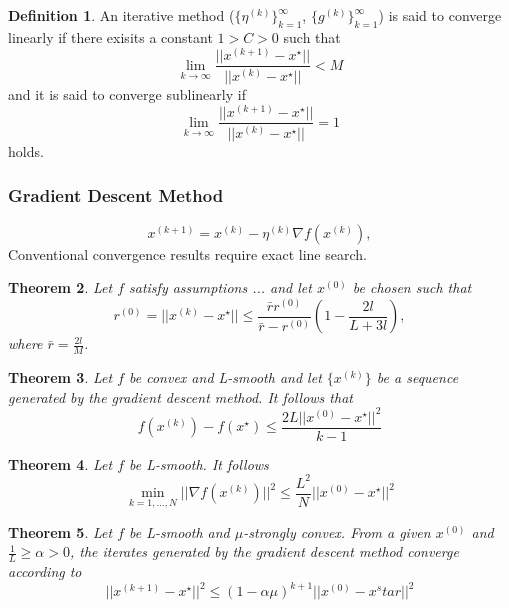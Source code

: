 \documentclass[12pt]{article}
\newtheorem{theorem}{Theorem}[section]
\theoremstyle{definition}
\newtheorem{definition}[theorem]{Definition}
\numberwithin{equation}{section}
\begin{document}
\begin{definition}
  An iterative method ($\{\eta^{(k)}\}_{k=1}^\infty$, $\{g^{(k)}\}_{k=1}^\infty$) is said to converge linearly if there exisits a constant $1 > C > 0$ such that 
  \begin{equation}
    \lim_{k \rightarrow \infty} \frac{||x^{(k+1)} - x^\star||}{||x^{(k)} - x^\star||} < M
  \end{equation}
  and it is said to converge sublinearly if 
  \begin{equation}
    \lim_{k \rightarrow \infty} \frac{||x^{(k+1)} - x^\star||}{||x^{(k)} - x^\star||} = 1
  \end{equation}
  holds.
\end{definition}
\subsubsection{Gradient Descent Method}
\begin{equation}  
  x^{(k+1)} = x^{(k)} - \eta^{(k)} \nabla f(x^{(k)}),
\end{equation}
Conventional convergence results require exact line search.

\cite{nesterov2003introductory}
\begin{theorem}
  Let $f$ satisfy assumptions ... and let $x^{(0)}$ be chosen such that 
  \begin{equation}
    r^{(0)} = ||x^{(k)} - x^\star|| \leq \frac{\bar{r}r^{(0)}}{\bar{r}-r^{(0)}}(1-\frac{2l}{L+3l}),
  \end{equation}
  where $\bar{r} = \frac{2l}{M}$.
\end{theorem}

\begin{theorem}
  Let $f$ be convex and L-smooth and let $\{x^{(k)}\}$ be a sequence generated by the gradient descent method. It follows that 
  \begin{equation}
    f(x^{(k)}) - f(x^\star) \leq \frac{2L||x^{(0)} - x^\star||^2}{k-1}
  \end{equation}
\end{theorem}

\begin{theorem}
  Let $f$ be L-smooth. It follows
  \begin{equation}
    \min_{k=1,\dots,N} ||\nabla f(x^{(k)})||^2 \leq \frac{L^2}{N}||x^{(0)}-x^\star||^2
  \end{equation}
\end{theorem}

\begin{theorem}
  Let $f$ be L-smooth and $\mu$-strongly convex. From a given $x^{(0)}$ and $\frac{1}{L} \geq \alpha > 0$, the iterates generated by the gradient descent method converge according to
  \begin{equation}
    ||x^{(k+1)} - x^\star ||^2 \leq (1-\alpha \mu)^{k+1}||x^{(0)} - x^star||^2
  \end{equation}
\end{theorem}
\end{document}

